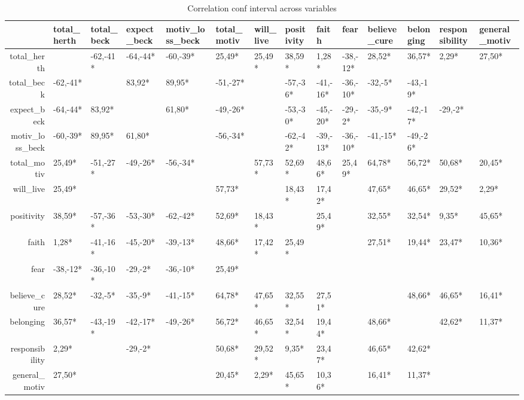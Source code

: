 \begin{sidewaystable}[ht]
\centering
\begingroup\tiny
\begin{tabular}{rlllllllllllll}
  \hline
 & total\_herth & total\_beck & expect\_beck & motiv\_loss\_beck & total\_motiv & will\_live & positivity & faith & fear & believe\_cure & belonging & responsibility & general\_motiv \\ 
  \hline
total\_herth &  & -62,-41* & -64,-44* & -60,-39* & 25,49* & 25,49* & 38,59* & 1,28* & -38,-12* & 28,52* & 36,57* & 2,29* & 27,50* \\ 
  total\_beck & -62,-41* &  & 83,92* & 89,95* & -51,-27* &  & -57,-36* & -41,-16* & -36,-10* & -32,-5* & -43,-19* &  &  \\ 
  expect\_beck & -64,-44* & 83,92* &  & 61,80* & -49,-26* &  & -53,-30* & -45,-20* & -29,-2* & -35,-9* & -42,-17* & -29,-2* &  \\ 
  motiv\_loss\_beck & -60,-39* & 89,95* & 61,80* &  & -56,-34* &  & -62,-42* & -39,-13* & -36,-10* & -41,-15* & -49,-26* &  &  \\ 
  total\_motiv & 25,49* & -51,-27* & -49,-26* & -56,-34* &  & 57,73* & 52,69* & 48,66* & 25,49* & 64,78* & 56,72* & 50,68* & 20,45* \\ 
  will\_live & 25,49* &  &  &  & 57,73* &  & 18,43* & 17,42* &  & 47,65* & 46,65* & 29,52* & 2,29* \\ 
  positivity & 38,59* & -57,-36* & -53,-30* & -62,-42* & 52,69* & 18,43* &  & 25,49* &  & 32,55* & 32,54* & 9,35* & 45,65* \\ 
  faith & 1,28* & -41,-16* & -45,-20* & -39,-13* & 48,66* & 17,42* & 25,49* &  &  & 27,51* & 19,44* & 23,47* & 10,36* \\ 
  fear & -38,-12* & -36,-10* & -29,-2* & -36,-10* & 25,49* &  &  &  &  &  &  &  &  \\ 
  believe\_cure & 28,52* & -32,-5* & -35,-9* & -41,-15* & 64,78* & 47,65* & 32,55* & 27,51* &  &  & 48,66* & 46,65* & 16,41* \\ 
  belonging & 36,57* & -43,-19* & -42,-17* & -49,-26* & 56,72* & 46,65* & 32,54* & 19,44* &  & 48,66* &  & 42,62* & 11,37* \\ 
  responsibility & 2,29* &  & -29,-2* &  & 50,68* & 29,52* & 9,35* & 23,47* &  & 46,65* & 42,62* &  &  \\ 
  general\_motiv & 27,50* &  &  &  & 20,45* & 2,29* & 45,65* & 10,36* &  & 16,41* & 11,37* &  &  \\ 
   \hline
\end{tabular}
\endgroup
\caption{Correlation conf interval across variables} 
\label{correlation_conf_interval_across_variables}
\end{sidewaystable}
